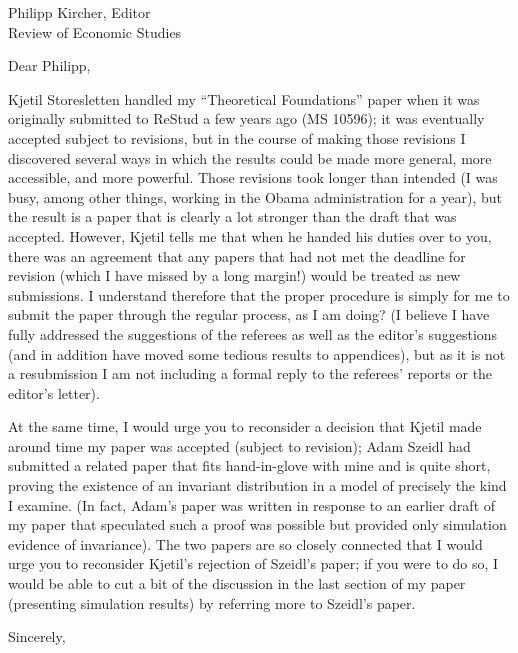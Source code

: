 \documentclass[12pt]{letter}
\begin{document}
\begin{letter}{
Philipp Kircher, Editor \\
Review of Economic Studies
}

\opening{Dear Philipp,}

Kjetil Storesletten handled my ``Theoretical Foundations'' paper when
it was originally submitted to ReStud a few years ago (MS 10596); it was
eventually accepted subject to revisions, but in the course of
making those revisions I discovered several ways in which the results
could be made more general, more accessible, and more powerful.  Those
revisions took longer than intended (I was busy, among other things,
working in the Obama administration for a year), but the result is a
paper that is clearly a lot stronger than the draft that was accepted.
However, Kjetil tells me that when he handed his duties over to you,
there was an agreement that any papers that had not met the deadline
for revision (which I have missed by a long margin!)  would be treated
as new submissions.  I understand therefore that the proper procedure
is simply for me to submit the paper through the regular process, as I
am doing?  (I believe I have fully addressed the suggestions of the
referees as well as the editor's suggestions (and in addition have
moved some tedious results to appendices), but as it is not a
resubmission I am not including a formal reply to the referees'
reports or the editor's letter).

At the same time, I would urge you to reconsider a decision that
Kjetil made around time my paper was accepted (subject to revision);
Adam Szeidl had submitted a related paper that fits hand-in-glove with
mine and is quite short, proving the existence of an invariant
distribution in a model of precisely the kind I examine.  (In fact,
Adam's paper was written in response to an earlier draft of my paper
that speculated such a proof was possible but provided only simulation
evidence of invariance).  The two papers are so closely connected that
I would urge you to reconsider Kjetil's rejection of Szeidl's paper;
if you were to do so, I would be able to cut a bit of the discussion
in the last section of my paper (presenting simulation results) by
referring more to Szeidl's paper.

\closing{Sincerely,}


\end{letter}
\end{document}
